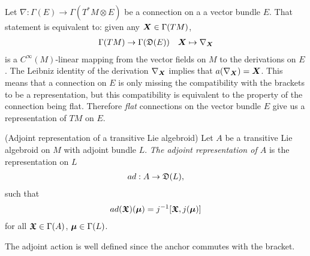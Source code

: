 \begin{example}
Let $\nabla: \Gamma(E) \to \Gamma(T^*M \otimes E)$ be a connection on a a vector bundle $E$. That statement is equivalent to: given any $\bm{X} \in \Gamma(TM)$,
\begin{align*}
    \Gamma(TM) \to \Gamma(\mathfrak{D}(E)) &&
    \bm{X} \mapsto \nabla_{\bm{X}}
\end{align*}
is a $C^\infty(M)$-linear mapping from the vector fields on $M$ to the derivations on $E$. The Leibniz identity of the derivation $\nabla_{\bm{X}}$ implies that $a(\nabla_{\bm{X}}) = \bm{X}$. This means that a connection on $E$ is only missing the compatibility with the brackets to be a representation, but this compatibility is equivalent to the property of the connection being flat. Therefore \emph{flat} connections on the vector bundle $E$ give us a representation of $TM$ on $E$.
\end{example}

\begin{definition}(Adjoint representation of a transitive Lie algebroid)\label{defnAdjointAct}
Let $A$ be a transitive Lie algebroid on $M$ with adjoint bundle $L$. \emph{The adjoint representation of $A$} is the representation on $L$
\begin{align*}
    ad: A \to \mathfrak{D}(L), 
\end{align*}
such that
\begin{align*}
     ad(\bm{\mathfrak{X}})(\bm{\mu}) = j^{-1}[\bm{\mathfrak{X}}, j(\bm{\mu})]
\end{align*}
for all $\bm{\mathfrak{X}} \in \Gamma(A)$, $\bm{\mu} \in \Gamma(L)$.
\end{definition}
The adjoint action is well defined since the anchor commutes with the bracket.

    
    
    
    


